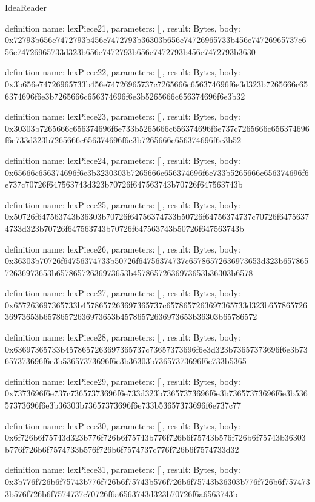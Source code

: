 \begin{lexlean}{IdeaReader}
\begin{semanticmodule}
definition{
  name: lexPiece21,
  parameters: [],
  result: Bytes,
  body: 0x72793b656e7472793b456e7472793b36303b656e74726965733b456e74726965737c656e74726965733d323b656e7472793b656e7472793b456e7472793b3630
}

definition{
  name: lexPiece22,
  parameters: [],
  result: Bytes,
  body: 0x3b656e74726965733b456e74726965737c7265666c656374696f6e3d323b7265666c656374696f6e3b7265666c656374696f6e3b5265666c656374696f6e3b32
}

definition{
  name: lexPiece23,
  parameters: [],
  result: Bytes,
  body: 0x30303b7265666c656374696f6e733b5265666c656374696f6e737c7265666c656374696f6e733d323b7265666c656374696f6e3b7265666c656374696f6e3b52
}

definition{
  name: lexPiece24,
  parameters: [],
  result: Bytes,
  body: 0x65666c656374696f6e3b3230303b7265666c656374696f6e733b5265666c656374696f6e737c70726f647563743d323b70726f647563743b70726f647563743b
}

definition{
  name: lexPiece25,
  parameters: [],
  result: Bytes,
  body: 0x50726f647563743b36303b70726f64756374733b50726f64756374737c70726f64756374733d323b70726f647563743b70726f647563743b50726f647563743b
}

definition{
  name: lexPiece26,
  parameters: [],
  result: Bytes,
  body: 0x36303b70726f64756374733b50726f64756374737c65786572636973653d323b65786572636973653b65786572636973653b45786572636973653b36303b6578
}

definition{
  name: lexPiece27,
  parameters: [],
  result: Bytes,
  body: 0x657263697365733b4578657263697365737c6578657263697365733d323b65786572636973653b65786572636973653b45786572636973653b36303b65786572
}

definition{
  name: lexPiece28,
  parameters: [],
  result: Bytes,
  body: 0x63697365733b4578657263697365737c73657373696f6e3d323b73657373696f6e3b73657373696f6e3b53657373696f6e3b36303b73657373696f6e733b5365
}

definition{
  name: lexPiece29,
  parameters: [],
  result: Bytes,
  body: 0x7373696f6e737c73657373696f6e733d323b73657373696f6e3b73657373696f6e3b53657373696f6e3b36303b73657373696f6e733b53657373696f6e737c77
}

definition{
  name: lexPiece30,
  parameters: [],
  result: Bytes,
  body: 0x6f726b6f75743d323b776f726b6f75743b776f726b6f75743b576f726b6f75743b36303b776f726b6f7574733b576f726b6f7574737c776f726b6f7574733d32
}

definition{
  name: lexPiece31,
  parameters: [],
  result: Bytes,
  body: 0x3b776f726b6f75743b776f726b6f75743b576f726b6f75743b36303b776f726b6f7574733b576f726b6f7574737c70726f6a6563743d323b70726f6a6563743b
}


\end{semanticmodule}
\end{lexlean}

